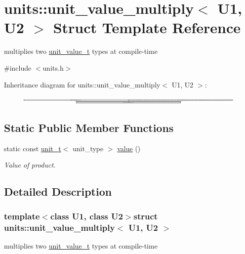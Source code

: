 \hypertarget{structunits_1_1unit__value__multiply}{}\section{units\+:\+:unit\+\_\+value\+\_\+multiply$<$ U1, U2 $>$ Struct Template Reference}
\label{structunits_1_1unit__value__multiply}


multiplies two \hyperlink{structunits_1_1unit__value__t}{unit\+\_\+value\+\_\+t} types at compile-\/time  




{\ttfamily \#include $<$units.\+h$>$}

Inheritance diagram for units\+:\+:unit\+\_\+value\+\_\+multiply$<$ U1, U2 $>$\+:\begin{figure}[H]
\begin{center}
\leavevmode
\includegraphics[height=0.284264cm]{structunits_1_1unit__value__multiply}
\end{center}
\end{figure}
\subsection*{Static Public Member Functions}
\begin{DoxyCompactItemize}
\item 
static const \hyperlink{classunits_1_1unit__t}{unit\+\_\+t}$<$ unit\+\_\+type $>$ \hyperlink{structunits_1_1unit__value__multiply_a465656e4257ea8b4d9cc5d072c45f1fe}{value} ()
\begin{DoxyCompactList}\small\item\em Value of product. \end{DoxyCompactList}\end{DoxyCompactItemize}


\subsection{Detailed Description}
\subsubsection*{template$<$class U1, class U2$>$struct units\+::unit\+\_\+value\+\_\+multiply$<$ U1, U2 $>$}

multiplies two \hyperlink{structunits_1_1unit__value__t}{unit\+\_\+value\+\_\+t} types at compile-\/time 

